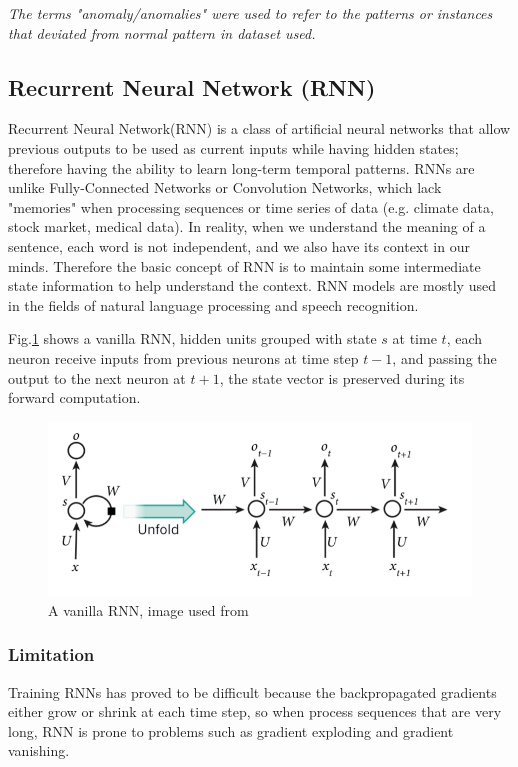 \documentclass{article}
\begin{document}
\textit{ The terms "anomaly/anomalies" were used to
refer to the patterns or instances that deviated from normal pattern in
dataset used. }


\subsection{Recurrent Neural Network (RNN)}

Recurrent Neural Network(RNN) is a class of artificial neural networks that
allow previous outputs to be used as current inputs
while having hidden states; therefore having the ability to learn long-term
temporal patterns. RNNs are unlike Fully-Connected Networks or Convolution
Networks, which lack "memories" when processing sequences or time series of
data (e.g. climate data, stock market, medical data). In reality,
when we understand the meaning of a sentence, each word is not independent, and
we also have its context in our minds. Therefore the basic concept of RNN is to
maintain some intermediate state information to help understand the
context. RNN models are mostly used in the fields of
natural language processing and speech recognition. 

Fig.\ref{fig:RNN} shows a vanilla RNN, hidden units grouped with state $s$ at
time $t$, each neuron receive inputs from previous neurons at time step $t-1$,
and passing the output to the next neuron at $t+1$, the state vector is
preserved during its forward computation. 

\begin{figure}[htb]
    \centering
\includegraphics[scale=0.3]{png/RNN.png}
    \caption{A vanilla RNN, image used from \cite{3-deeplearning}}
    \label{fig:RNN}
\end{figure}


\subsubsection{Limitation} 
Training RNNs has proved to be difficult because the backpropagated gradients
either grow or shrink at each time step, so when process sequences
that are very long, RNN is prone to problems such as gradient exploding and
gradient vanishing\cite{3-deeplearning}. 
\end{document}
